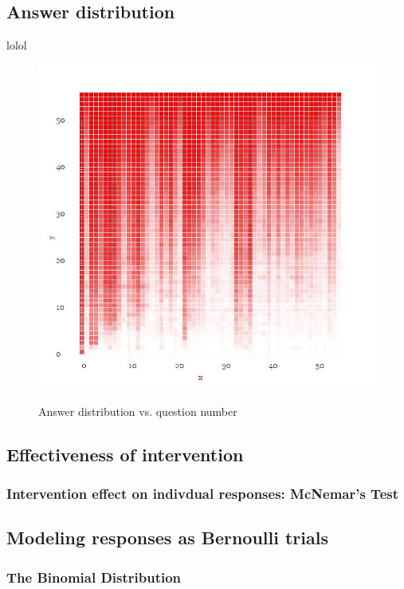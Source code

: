 \documentclass[10pt]{article}
\begin{document}
\subsection{Answer distribution}
lolol
\begin{figure}
\caption{Answer distribution vs. question number}
\label{AnswerDistribution}
\begin{center}
\includegraphics[width=120mm]{ReportMedia/AnswerDistribution.jpg}\\
\end{center}
\end{figure}
\newpage

\subsection{Effectiveness of intervention}
\subsubsection{Intervention effect on indivdual responses: McNemar's Test}

\newpage
\subsection{Modeling responses as Bernoulli trials}
\newpage
\subsubsection{The Binomial Distribution}
\newpage
\end{document}
